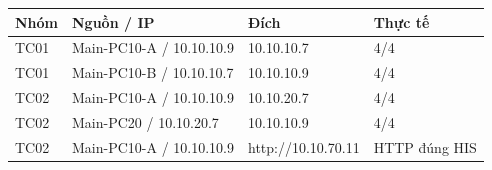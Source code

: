 \begin{tabularx}{\linewidth}{@{}lXXl@{}}\toprule
Nhóm & Nguồn / IP & Đích & Thực tế\\\midrule
TC01 & Main-PC10-A / 10.10.10.9 & 10.10.10.7 & 4/4\\
TC01 & Main-PC10-B / 10.10.10.7 & 10.10.10.9 & 4/4\\
TC02 & Main-PC10-A / 10.10.10.9 & 10.10.20.7 & 4/4\\
TC02 & Main-PC20 / 10.10.20.7 & 10.10.10.9 & 4/4\\
TC02 & Main-PC10-A / 10.10.10.9 & http://10.10.70.11 & HTTP đúng HIS\\
\bottomrule\end{tabularx}
